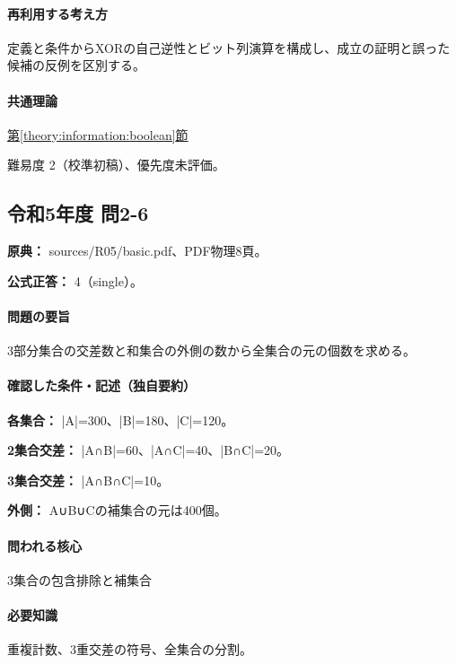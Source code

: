 \paragraph{再利用する考え方} 定義と条件からXORの自己逆性とビット列演算を構成し、成立の証明と誤った候補の反例を区別する。

\paragraph{共通理論} \hyperref[theory:information:boolean]{第\ref*{theory:information:boolean}節}

\par 難易度 2（校準初稿）、優先度未評価。

\subsection{令和5年度 問2-6}
\label{q:r05-reg-basic-2-6}

\noindent\textbf{原典：} sources/R05/basic.pdf、PDF物理8頁。

\textbf{公式正答：} 4（single）。

\paragraph{問題の要旨} 3部分集合の交差数と和集合の外側の数から全集合の元の個数を求める。

\paragraph{確認した条件・記述（独自要約）}\mbox{}\par

\noindent\textbf{各集合：} |A|=300、|B|=180、|C|=120。\par

\noindent\textbf{2集合交差：} |A∩B|=60、|A∩C|=40、|B∩C|=20。\par

\noindent\textbf{3集合交差：} |A∩B∩C|=10。\par

\noindent\textbf{外側：} A∪B∪Cの補集合の元は400個。\par

\paragraph{問われる核心} 3集合の包含排除と補集合

\paragraph{必要知識} 重複計数、3重交差の符号、全集合の分割。


